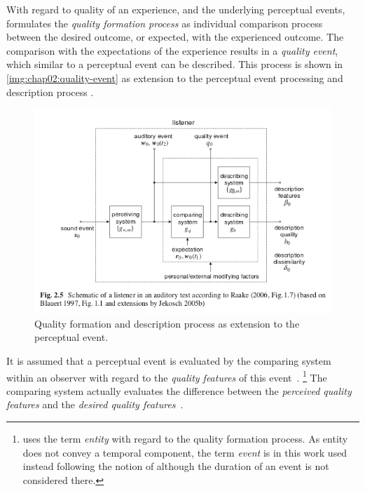 With regard to quality of an experience, and the underlying perceptual events, \cite{jekosch_voice_2005} formulates the \emph{quality formation process} as individual comparison process between the desired outcome, or expected, with the experienced outcome.
The comparison with the expectations of the experience results in a \emph{quality event}, which similar to a perceptual event can be described.
This process is shown in \autoref{img:chap02:quality-event} as extension to the perceptual event processing and description process .
\begin{figure}
	\includegraphics[width=1\textwidth]{fig/quality-event}
	\caption{Quality formation and description process as extension to the perceptual event.}
	\label{img:chap02:quality-event}
\end{figure}

It is assumed that a perceptual event is evaluated by the comparing system within an observer with regard to the \emph{quality features} of this event~\cite[\cf p. 17]{jekosch_voice_2005}.
\footnote{\cite{jekosch_voice_2005} uses the term \emph{entity} with regard to the quality formation process.
As entity does not convey a temporal component, the term \emph{event} is in this work used instead following the notion of \cite{blauert_spatial_1996} although the duration of an event is not considered there.}
The comparing system actually evaluates the difference between the \emph{perceived quality features} and the \emph{desired quality features}~\cite[p. 23]{raake_book}.

